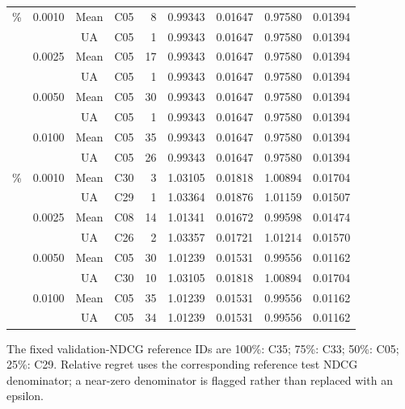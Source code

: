 \begin{table}[H]
{\begin{tabular}{@{}llccrrrrr@{}}
\addlinespace
50\% & 0.0010 & Mean & C05 & 8 & 0.99343 & 0.01647 & 0.97580 & 0.01394 \\
 &  & UA & C05 & 1 & 0.99343 & 0.01647 & 0.97580 & 0.01394 \\
 & 0.0025 & Mean & C05 & 17 & 0.99343 & 0.01647 & 0.97580 & 0.01394 \\
 &  & UA & C05 & 1 & 0.99343 & 0.01647 & 0.97580 & 0.01394 \\
 & 0.0050 & Mean & C05 & 30 & 0.99343 & 0.01647 & 0.97580 & 0.01394 \\
 &  & UA & C05 & 1 & 0.99343 & 0.01647 & 0.97580 & 0.01394 \\
 & 0.0100 & Mean & C05 & 35 & 0.99343 & 0.01647 & 0.97580 & 0.01394 \\
 &  & UA & C05 & 26 & 0.99343 & 0.01647 & 0.97580 & 0.01394 \\
\addlinespace
25\% & 0.0010 & Mean & C30 & 3 & 1.03105 & 0.01818 & 1.00894 & 0.01704 \\
 &  & UA & C29 & 1 & 1.03364 & 0.01876 & 1.01159 & 0.01507 \\
 & 0.0025 & Mean & C08 & 14 & 1.01341 & 0.01672 & 0.99598 & 0.01474 \\
 &  & UA & C26 & 2 & 1.03357 & 0.01721 & 1.01214 & 0.01570 \\
 & 0.0050 & Mean & C05 & 30 & 1.01239 & 0.01531 & 0.99556 & 0.01162 \\
 &  & UA & C30 & 10 & 1.03105 & 0.01818 & 1.00894 & 0.01704 \\
 & 0.0100 & Mean & C05 & 35 & 1.01239 & 0.01531 & 0.99556 & 0.01162 \\
 &  & UA & C05 & 34 & 1.01239 & 0.01531 & 0.99556 & 0.01162 \\
\bottomrule
\end{tabular}%
}
\par\smallskip\footnotesize The fixed validation-NDCG reference IDs are 100\%: C35; 75\%: C33; 50\%: C05; 25\%: C29. Relative regret uses the corresponding reference test NDCG denominator; a near-zero denominator is flagged rather than replaced with an epsilon.
\end{table}
